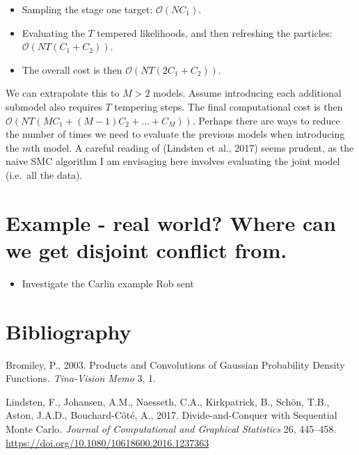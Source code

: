 \documentclass[10pt,a4paper,]{article}
\providecommand{\tightlist}{%
  \setlength{\itemsep}{0pt}\setlength{\parskip}{0pt}}
\newcommand{\Nx}{N}
\newcommand{\Nm}{M}
\newcommand{\modelindex}{m}
\begin{document}
\begin{itemize}
\tightlist
\item
  Sampling the stage one target: \(\mathcal{O}(\Nx C_{1})\).
\item
  Evaluating the \(T\) tempered likelihoods, and then refreshing the
  particles: \(\mathcal{O}(\Nx T (C_{1} + C_{2}))\). 
\item
  The overall cost is then \(\mathcal{O}(\Nx T (2 C_{1} + C_{2}))\).
\end{itemize}

We can extrapolate this to \(\Nm > 2\) models. Assume introducing each
additional submodel also requires \(T\) tempering steps. The final
computational cost is then
\(\mathcal{O}(\Nx T (\Nm C_{1} + (\Nm - 1) C_{2} + \ldots + C_{\Nm}))\).
Perhaps there are ways to reduce the number of times we need to evaluate
the previous models when introducing the \(\modelindex\)th model. A
careful reading of (Lindsten et al., 2017) seems prudent, as the naive
SMC algorithm I am envisaging here involves evaluating the joint model
(i.e.~all the data).

\section{Example - real world? Where can we get disjoint conflict
from.}\label{example---real-world-where-can-we-get-disjoint-conflict-from.}

\begin{itemize}
\tightlist
\item
  Investigate the Carlin example Rob sent
\end{itemize}

\newpage

\section*{Bibliography}\label{bibliography}

\hypertarget{refs}{}
\hypertarget{ref-bromiley:03}{}
Bromiley, P., 2003. Products and Convolutions of Gaussian Probability
Density Functions\emph{. Tina-Vision Memo} 3, 1.

\hypertarget{ref-lindsten:etal:17}{}
Lindsten, F., Johansen, A.M., Naesseth, C.A., Kirkpatrick, B., Schön,
T.B., Aston, J.A.D., Bouchard-Côté, A., 2017. Divide-and-Conquer with
Sequential Monte Carlo\emph{. Journal of Computational and Graphical
Statistics} 26, 445--458.
\url{https://doi.org/10.1080/10618600.2016.1237363}
\end{document}
